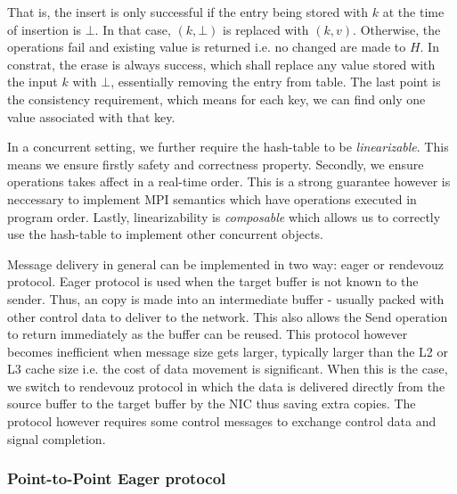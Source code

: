 \documentclass[11pt]{article}
\begin{document}
That is, the insert is only successful if the entry being stored with $k$ at
the time of insertion is $\bot$.  In that case, $(k,\bot)$ is replaced with
$(k, v)$. Otherwise, the operations fail and existing value is returned i.e. no
changed are made to $H$. In constrat, the erase is always success, which shall
replace any value stored with the input $k$ with $\bot$, essentially removing
the entry from table.  The last point is the consistency requirement, which
means for each key, we can find only one value associated with that key.

In a concurrent setting, we further require the hash-table to be
\textit{linearizable}.  This means we ensure firstly safety and correctness
property. Secondly, we ensure operations takes affect in a real-time order.
This is a strong guarantee however is neccessary to implement MPI semantics
which have operations executed in program order. Lastly, linearizability is 
\textit{composable} which allows us to correctly use the hash-table to implement
other concurrent objects.

Message delivery in general can be implemented in two way: eager or rendevouz
protocol. Eager protocol is used when the target buffer is not known to the
sender. Thus, an copy is made into an intermediate buffer - usually packed with
other control data to deliver to the network. This also allows the Send
operation to return immediately as the buffer can be reused.  This protocol
however becomes inefficient when message size gets larger, typically larger
than the L2 or L3 cache size i.e. the cost of data movement is significant.
When this is the case, we switch to rendevouz protocol in which the data is
delivered directly from the source buffer to the target buffer by the NIC thus
saving extra copies.  The protocol however requires some control messages to
exchange control data and signal completion.

\subsubsection{Point-to-Point Eager protocol}
\end{document}
